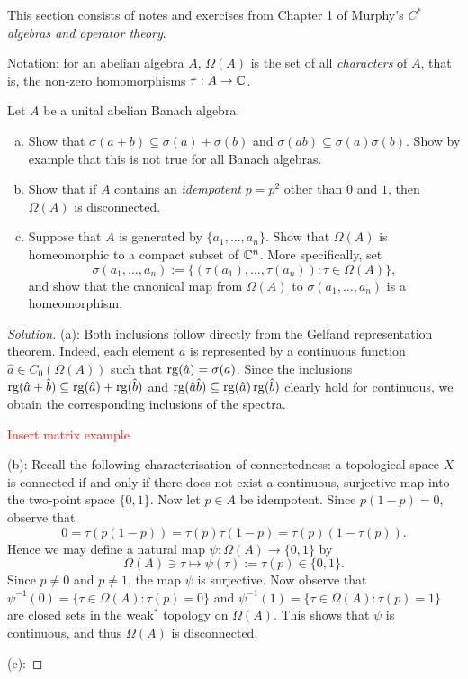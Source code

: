 This section consists of notes and exercises from Chapter 1 of Murphy's \emph{$C^*$ algebras and operator theory}.

Notation: for an abelian algebra $A$, $\Omega(A)$ is the set of all \emph{characters} of $A$, that is, the non-zero homomorphisms $\tau:A\to\mathbb{C}$.
\begin{exercise}
	Let $A$ be a unital abelian Banach algebra.
	\begin{enumerate}[(a)]
		\item Show that $\sigma(a+b)\subseteq\sigma(a)+\sigma(b)$ and $\sigma(ab)\subseteq\sigma(a)\sigma(b)$. Show by example that this is not true for all Banach algebras.
		\item Show that if $A$ contains an \emph{idempotent} $p=p^2$ other than $0$ and $1$, then $\Omega(A)$ is disconnected.
		\item Suppose that $A$ is generated by $\{a_1, \ldots, a_n\}$. Show that $\Omega(A)$ is homeomorphic to a compact subset of $\mathbb{C}^n$. More specifically, set
		\begin{equation*}
			\sigma(a_1,\ldots,a_n) := \{ (\tau(a_1),\ldots,\tau(a_n)) : \tau\in\Omega(A) \},
		\end{equation*}
		and show that the canonical map from $\Omega(A)$ to $\sigma(a_1,\ldots,a_n)$ is a homeomorphism.
	\end{enumerate}
\end{exercise}

\begin{proof}[Solution]
	(a): Both inclusions follow directly from the Gelfand representation theorem. Indeed, each element $a$ is represented by a continuous function $\hat{a}\in C_0(\Omega(A))$ such that $\operatorname{rg}(\hat{a})=\sigma(a)$. Since the inclusions $\operatorname{rg}(\hat{a}+\hat{b})\subseteq\operatorname{rg}(\hat{a})+\operatorname{rg}(\hat{b})$ and $\operatorname{rg}(\hat{a}\hat{b})\subseteq\operatorname{rg}(\hat{a})\operatorname{rg}(\hat{b})$ clearly hold for continuous, we obtain the corresponding inclusions of the spectra.
	
	\textcolor{red}{Insert matrix example}
	
	(b): Recall the following characterisation of connectedness: a topological space $X$ is connected if and only if there does not exist a continuous, surjective map into the two-point space $\{0,1\}$. Now let $p\in A$ be idempotent. Since $p(1-p)=0$, observe that
	\begin{equation*}
		0=\tau(p(1-p))=\tau(p)\tau(1-p)=\tau(p)(1-\tau(p)).
	\end{equation*}
	Hence we may define a natural map $\psi : \Omega(A)\to\{0,1\}$ by
	\begin{equation*}
		\Omega(A) \ni \tau \mapsto \psi(\tau) := \tau(p)\in\{0,1\}.
	\end{equation*}
	Since $p\ne 0$ and $p\ne 1$, the map $\psi$ is surjective. Now observe that $\psi^{-1}(0) = \{\tau\in\Omega(A):\tau(p)=0\}$ and $\psi^{-1}(1)=\{\tau\in\Omega(A):\tau(p)=1\}$ are closed sets in the weak$^*$ topology on $\Omega(A)$. This shows that $\psi$ is continuous, and thus $\Omega(A)$ is disconnected.
	
	(c):
\end{proof}

